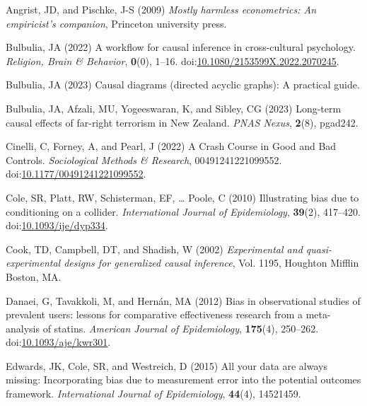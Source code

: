 \documentclass[
  singlecolumn]{article}
\newlength{\cslhangindent}
\newenvironment{CSLReferences}[2] %
 {\begin{list}{}{%
  \setlength{\itemindent}{0pt}
  \setlength{\leftmargin}{0pt}
  \setlength{\parsep}{0pt}
  \ifodd #1
   \setlength{\leftmargin}{\cslhangindent}
   \setlength{\itemindent}{-1\cslhangindent}
  \fi
  \setlength{\itemsep}{#2\baselineskip}}}
 {\end{list}}
\begin{document}
\label{refs}
\begin{CSLReferences}{1}{0}
Angrist, JD, and Pischke, J-S (2009) \emph{Mostly harmless econometrics:
An empiricist's companion}, Princeton university press.

Bulbulia, JA (2022) A workflow for causal inference in cross-cultural
psychology. \emph{Religion, Brain \& Behavior}, \textbf{0}(0), 1--16.
doi:\href{https://doi.org/10.1080/2153599X.2022.2070245}{10.1080/2153599X.2022.2070245}.

Bulbulia, JA (2023) Causal diagrams (directed acyclic graphs): A
practical guide.

Bulbulia, JA, Afzali, MU, Yogeeswaran, K, and Sibley, CG (2023)
Long-term causal effects of far-right terrorism in {N}ew {Z}ealand.
\emph{PNAS Nexus}, \textbf{2}(8), pgad242.

Cinelli, C, Forney, A, and Pearl, J (2022) A Crash Course in Good and
Bad Controls. \emph{Sociological Methods \& Research},
00491241221099552.
doi:\href{https://doi.org/10.1177/00491241221099552}{10.1177/00491241221099552}.

Cole, SR, Platt, RW, Schisterman, EF, \ldots{} Poole, C (2010)
Illustrating bias due to conditioning on a collider. \emph{International
Journal of Epidemiology}, \textbf{39}(2), 417--420.
doi:\href{https://doi.org/10.1093/ije/dyp334}{10.1093/ije/dyp334}.

Cook, TD, Campbell, DT, and Shadish, W (2002) \emph{Experimental and
quasi-experimental designs for generalized causal inference}, Vol. 1195,
Houghton Mifflin Boston, MA.

Danaei, G, Tavakkoli, M, and Hernán, MA (2012) Bias in observational
studies of prevalent users: lessons for comparative effectiveness
research from a meta-analysis of statins. \emph{American Journal of
Epidemiology}, \textbf{175}(4), 250--262.
doi:\href{https://doi.org/10.1093/aje/kwr301}{10.1093/aje/kwr301}.

Edwards, JK, Cole, SR, and Westreich, D (2015) All your data are always
missing: Incorporating bias due to measurement error into the potential
outcomes framework. \emph{International Journal of Epidemiology},
\textbf{44}(4), 14521459.


\end{CSLReferences}
\end{document}
